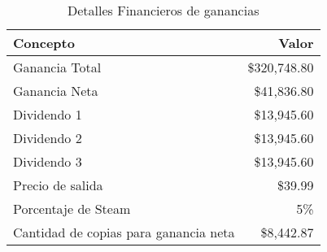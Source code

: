 \begin{table}[H]
\centering
\begin{tabular}{|l|r|}
\hline
\textbf{Concepto}                      & \textbf{Valor}        \\ \hline
Ganancia Total                         & \$320,748.80          \\ \hline
Ganancia Neta                          & \$41,836.80           \\ \hline
Dividendo 1                            & \$13,945.60           \\ \hline
Dividendo 2                            & \$13,945.60           \\ \hline
Dividendo 3                            & \$13,945.60           \\ \hline
Precio de salida                       & \$39.99               \\ \hline
Porcentaje de Steam                    & 5\%                   \\ \hline
Cantidad de copias para ganancia neta   & \$8,442.87            \\ \hline
\end{tabular}
\caption{Detalles Financieros de ganancias}
\label{tabla_detalles_financieros}
\end{table}
